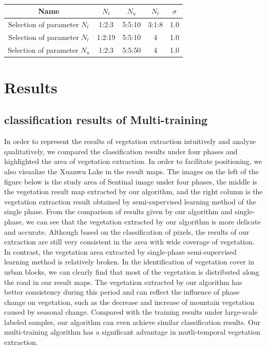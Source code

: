 \documentclass{isprs} %
\begin{document}
\begin{table}[ht!]
	\begin{center}
		\begin{tabular}{c|cccc}
		\toprule
		Name & $N_l$ & $N_u$ & $N_t$ &$\sigma$ \\
		\midrule
		Selection of parameter $N_t$ & 1:2:3 & 5:5:10 & 3:1:8& 1.0\\
		Selection of parameter $N_l$ & 1:2:19& 5:5:10 & 4& 1.0\\
		Selection of parameter $N_u$ & 1:2:3& 5:5:50 & 4& 1.0\\
		\bottomrule
		\end{tabular}
	\caption{}
	\end{center}
\end{table}

\section{Results}\label{sec:Results}

\subsection{classification results of Multi-training}

In order to represent the results of vegetation extraction intuitively and analyze qualitatively, we compared the classification results under four phases and highlighted the area of vegetation extraction. In order to facilitate positioning, we also visualize the Xuanwu Lake in the result maps. The images on the left of the figure below is the study area of Sentinal image under four phases, the middle is the vegetation result map extracted by our algorithm, and the right column is the vegetation extraction result obtained by semi-supervised learning method of the single phase. From the comparison of results given by our algorithm and single-phase, we can see that the vegetation extracted by our algorithm is more delicate and accurate. Although based on the classification of pixels, the results of our extraction are still very consistent in the area with wide coverage of vegetation. In contrast, the vegetation area extracted by single-phase semi-supervised learning method is relatively broken. In the identification of vegetation cover in urban blocks, we can clearly find that most of the vegetation is distributed along the road in our result maps. The vegetation extracted by our algorithm has better consistency during this period and can reflect the influence of phase change on vegetation, such as the decrease and increase of mountain vegetation caused by seasonal change. Compared with the training results under large-scale labeled samples, our algorithm can even achieve similar classification results. Our multi-training algorithm has a significant advantage in mutli-temporal vegetation extraction.
\end{document}
